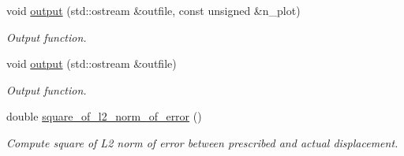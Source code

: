 \begin{DoxyCompactItemize}
void \hyperlink{classoomph_1_1ImposeDisplacementByLagrangeMultiplierElement_aabe7cb82a9040aec297ad37f55550e3d}{output} (std\+::ostream \&outfile, const unsigned \&n\+\_\+plot)
\begin{DoxyCompactList}\small\item\em Output function. \end{DoxyCompactList}\item 
void \hyperlink{classoomph_1_1ImposeDisplacementByLagrangeMultiplierElement_a5b3cc07419816463f67ec4ded04e2f66}{output} (std\+::ostream \&outfile)
\begin{DoxyCompactList}\small\item\em Output function. \end{DoxyCompactList}\item 
double \hyperlink{classoomph_1_1ImposeDisplacementByLagrangeMultiplierElement_a911c9bced8c0bdb15dbd4dd6bb2fcb5a}{square\+\_\+of\+\_\+l2\+\_\+norm\+\_\+of\+\_\+error} ()
\begin{DoxyCompactList}\small\item\em Compute square of L2 norm of error between prescribed and actual displacement. \end{DoxyCompactList}\end{DoxyCompactItemize}
